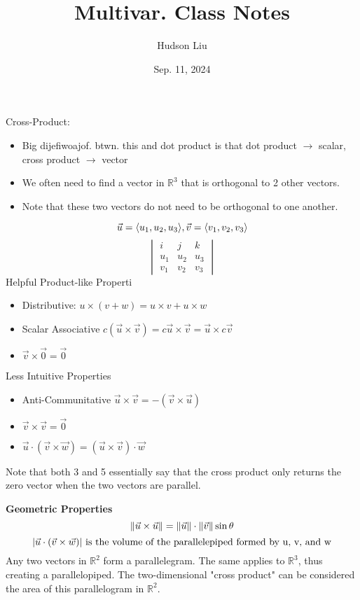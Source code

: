 \documentclass{article}
\title{Multivar. Class Notes}
\author{Hudson Liu}
\date{Sep. 11, 2024}
\DeclarePairedDelimiter{\opair}{\langle}{\rangle}
\newcommand{\R}{\mathbb{R}}
\begin{document}
\maketitle
Cross-Product:
\begin{itemize}
    \item Big dijefiwoajof. btwn. this and dot product is that dot product $\rightarrow$ scalar, cross product $\rightarrow$ vector
    \item We often need to find a vector in $\R^3$ that is orthogonal to 2 other vectors.
    \item Note that these two vectors do not need to be orthogonal to one another.
\end{itemize}
\[
    \vec{u} = \opair{u_1, u_2, u_3}, \vec{v} = \opair{v_1, v_2, v_3}
\]
\[
\begin{vmatrix}
    i & j & k\\
    u_1 & u_2 & u_3\\
    v_1 & v_2 & v_3
\end{vmatrix}
\]
Helpful Product-like Properti
\begin{itemize}
    \item Distributive: $u \times (v + w) = u \times v + u \times w$
    \item Scalar Associative $c(\vec{u} \times \vec{v})= c\vec{u} \times \vec{v} = \vec{u} \times c\vec{v}$
    \item $\vec{v} \times \vec{0} = \vec{0}$
\end{itemize}

Less Intuitive Properties
\begin{itemize}
    \item Anti-Communitative $\vec{u} \times \vec{v} = -(\vec{v} \times \vec{u})$
    \item $\vec{v} \times \vec{v} = \vec{0}$
    \item $\vec{u} \cdot (\vec{v} \times \vec{w}) = (\vec{u} \times \vec{v}) \cdot \vec{w}$
\end{itemize}
Note that both 3 and 5 essentially say that the cross product only returns the zero vector when the two vectors are parallel.\newline

\textbf{Geometric Properties}
\[
    \norm{\vec{u} \times \vec{u}} = \norm{\vec{u}} \cdot \norm{\vec{v}} \sin{\theta}
\]
\[
    \abs{\vec{u} \cdot (\vec{v} \times \vec{w})} \text{ is the volume of the parallelepiped formed by u, v, and w}
\]
Any two vectors in $\R^2$ form a parallelegram. The same applies to $\R^3$, thus creating a parallelopiped. The two-dimensional "cross product" can be considered the area of this parallelogram in $\R^2$.
\end{document}
